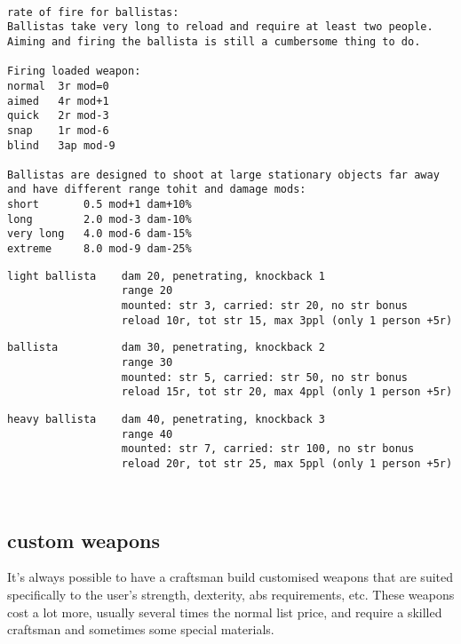 \

\goodbreak \small \begin{samepage} \begin{verbatim}
rate of fire for ballistas:
Ballistas take very long to reload and require at least two people.
Aiming and firing the ballista is still a cumbersome thing to do.

Firing loaded weapon:
normal  3r mod=0
aimed   4r mod+1
quick   2r mod-3
snap    1r mod-6
blind   3ap mod-9

Ballistas are designed to shoot at large stationary objects far away 
and have different range tohit and damage mods:
short       0.5 mod+1 dam+10%
long        2.0 mod-3 dam-10%
very long   4.0 mod-6 dam-15%
extreme     8.0 mod-9 dam-25%
\end{verbatim} \blocklistgap \begin{verbatim}
light ballista    dam 20, penetrating, knockback 1
                  range 20
                  mounted: str 3, carried: str 20, no str bonus
                  reload 10r, tot str 15, max 3ppl (only 1 person +5r)
\end{verbatim} \blocklistgap \begin{verbatim}
ballista          dam 30, penetrating, knockback 2
                  range 30
                  mounted: str 5, carried: str 50, no str bonus
                  reload 15r, tot str 20, max 4ppl (only 1 person +5r)
\end{verbatim} \blocklistgap \begin{verbatim}
heavy ballista    dam 40, penetrating, knockback 3
                  range 40
                  mounted: str 7, carried: str 100, no str bonus
                  reload 20r, tot str 25, max 5ppl (only 1 person +5r)
\end{verbatim} \end{samepage} \normalsize \goodbreak

\


\subsection*{custom weapons}
It's always possible to have a craftsman build customised weapons that are suited specifically to the user's strength, dexterity, abs requirements, etc. These weapons cost a lot more, usually several times the normal list price, and require a skilled craftsman and sometimes some special materials.


